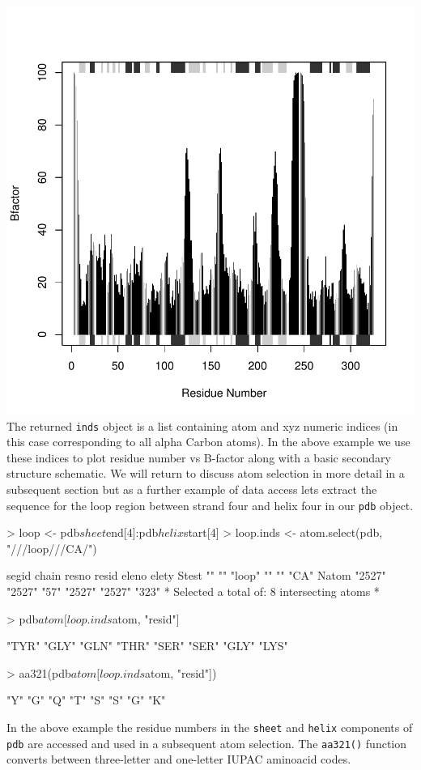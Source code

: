 \documentclass[a4paper]{article}
\begin{document}
\includegraphics{figs/fig-005}
The returned \texttt{inds} object is a list containing atom and xyz numeric indices (in this case corresponding to all alpha Carbon atoms). In the above example we use these indices to plot residue number vs B-factor along with a basic secondary structure schematic. We will return to discuss atom selection in more detail in a subsequent section but as a further example of data access lets extract the sequence for the loop region between strand four and helix four in our \texttt{pdb} object.
\begin{Schunk}
\begin{Sinput}
> loop <- pdb$sheet$end[4]:pdb$helix$start[4]
> loop.inds <- atom.select(pdb, "///loop///CA/")
\end{Sinput}
\begin{Soutput}
      segid  chain  resno  resid  eleno  elety
Stest ""     ""     "loop" ""     ""     "CA" 
Natom "2527" "2527" "57"   "2527" "2527" "323"
 *  Selected a total of: 8 intersecting atoms  *
\end{Soutput}
\begin{Sinput}
> pdb$atom[loop.inds$atom, "resid"]
\end{Sinput}
\begin{Soutput}
[1] "TYR" "GLY" "GLN" "THR" "SER" "SER" "GLY" "LYS"
\end{Soutput}
\begin{Sinput}
> aa321(pdb$atom[loop.inds$atom, "resid"])
\end{Sinput}
\begin{Soutput}
[1] "Y" "G" "Q" "T" "S" "S" "G" "K"
\end{Soutput}
\end{Schunk}
In the above example the residue numbers in the \texttt{sheet} and \texttt{helix} components of \texttt{pdb} are accessed and used in a subsequent atom selection. The \texttt{aa321()} function converts between three-letter and one-letter IUPAC aminoacid codes.
\end{document}
